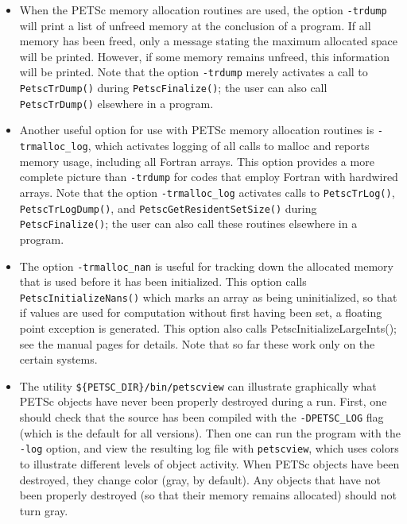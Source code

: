 {\begin{itemize}
 
\item When the PETSc memory allocation routines are used, the option 
{\tt -trdump} will print a list of unfreed memory at the conclusion of a
program.  If all memory has been freed, only a message stating
the maximum allocated space will be printed.  However, if some memory
remains unfreed, this information will be printed.  Note that the
option {\tt -trdump} merely activates a call to {\tt PetscTrDump()} during
{\tt PetscFinalize()}; the user can also call {\tt PetscTrDump()} elsewhere
in a program.

 
 
\item Another useful option for use with PETSc memory allocation
routines is {\tt -trmalloc\_log}, which activates logging of all calls
to malloc and reports memory usage, including all Fortran arrays.
This option provides a more complete picture than {\tt -trdump} for
codes that employ Fortran with hardwired arrays.  Note that the option
{\tt -trmalloc\_log} activates calls to {\tt PetscTrLog()}, {\tt
PetscTrLogDump()}, and {\tt PetscGetResidentSetSize()} during {\tt
PetscFinalize()}; the user can also call these routines elsewhere in a
program.

 
\item The option {\tt -trmalloc\_nan} is useful for tracking down the
allocated memory that is used before it has been initialized.  This
option calls {\tt PetscInitializeNans()} which marks an array as being
uninitialized, so that if values are used for computation without
first having been set, a floating point exception is generated.  This
option also calls {PetscInitializeLargeInts()}; see the manual pages for
details.  Note that so far these work only on the certain systems.

\item The utility {\tt \$\{PETSC\_DIR\}/bin/petscview} can illustrate graphically
what PETSc objects have never been properly destroyed during a run.  
First, one should check that the source has been compiled with the
{\tt -DPETSC\_LOG} flag (which is the default for all versions).
Then one can run the program with the {\tt -log} option, and view the resulting
log file with {\tt petscview}, which uses colors to illustrate different
levels of object activity.  When PETSc objects have been destroyed,
they change color (gray, by default).  Any objects that have not
been properly destroyed (so that their memory remains allocated)
should not turn gray.
\end{itemize}

}
